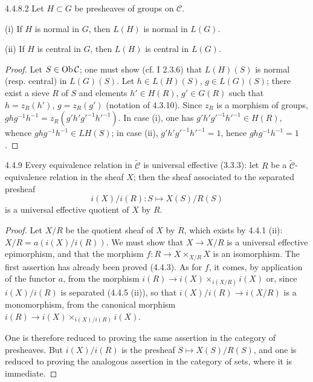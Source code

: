 \begin{lemma}{4.4.8.2}\label{IV.4.4.8.2}
Let \(H\subset G\) be presheaves of groups on \(\mathcal C\).

(i) If \(H\) is normal in \(G\), then \(L(H)\) is normal in \(L(G)\).

(ii) If \(H\) is central in \(G\), then \(L(H)\) is central in \(L(G)\).
\end{lemma}
\begin{proof}
Let \(S\in\operatorname{Ob}\mathcal C\); one must show (cf. I 2.3.6) that
\(L(H)(S)\) is normal (resp. central) in \(L(G)(S)\).
Let \(h\in L(H)(S)\), \(g\in L(G)(S)\); there exist a sieve \(R\)
of \(S\) and elements \(h'\in H(R)\), \(g'\in G(R)\) such that
\(h=z_R(h')\), \(g=z_R(g')\) (notation of 4.3.10).
Since \(z_R\) is a morphism of groups,
\(ghg^{-1}h^{-1}=z_R(g'h'g'^{-1}h'^{-1})\).
In case (i), one has \(g'h'g'^{-1}h'^{-1}\in H(R)\), whence
\(ghg^{-1}h^{-1}\in LH(S)\); in case (ii),
\(g'h'g'^{-1}h'^{-1}=1\), hence \(ghg^{-1}h^{-1}=1\).
\end{proof}

\begin{proposition}{4.4.9}\label{IV.4.4.9}
Every equivalence relation in \(\widetilde{\mathcal C}\) is universal
effective (3.3.3): let \(R\) be a \(\widetilde{\mathcal C}\)-equivalence
relation in the sheaf \(X\); then the sheaf associated to the
separated presheaf
\[
i(X)/i(R):S\longmapsto X(S)/R(S)
\]
is a universal effective quotient of \(X\) by \(R\).
\end{proposition}
\begin{proof}
Let \(X/R\) be the quotient sheaf of \(X\) by \(R\), which exists
by 4.4.1 (ii): \(X/R=a(i(X)/i(R))\).
We must show that \(X\to X/R\) is a universal effective
epimorphism, and that the morphism \(f:R\to X\times_{X/R}X\)
is an isomorphism. The first assertion has already been proved
(4.4.3). As for \(f\), it comes, by application of the functor \(a\),
from the morphism \(i(R)\to i(X)\times_{i(X/R)}i(X)\) or,
since \(i(X)/i(R)\) is separated (4.4.5 (ii)), so that
\(i(X)/i(R)\to i(X/R)\) is a monomorphism, from the canonical
morphism \(i(R)\to i(X)\times_{i(X)/i(R)}i(X)\).

One is therefore reduced to proving the same assertion in the
category of presheaves. But \(i(X)/i(R)\) is the presheaf
\(S\mapsto X(S)/R(S)\), and one is reduced to proving the
analogous assertion in the category of sets, where it is immediate.
\end{proof}

